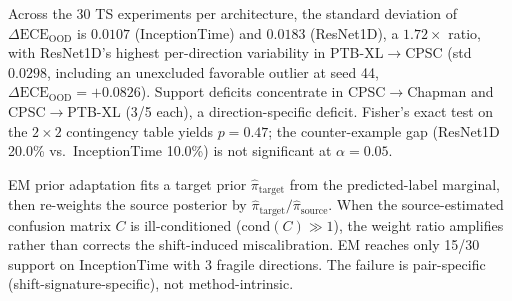 \documentclass[review,12pt,nonatbib]{elsarticle}
\begin{document}
Across the 30 TS experiments per
architecture, the standard deviation of $\Delta\text{ECE}_{\text{OOD}}$
is $0.0107$ (InceptionTime) and $0.0183$ (ResNet1D), a $1.72\times$
ratio, with ResNet1D's highest per-direction variability in
PTB-XL$\rightarrow$CPSC (std $0.0298$, including an unexcluded
favorable outlier at seed 44, $\Delta\text{ECE}_{\text{OOD}}=+0.0826$).
Support deficits concentrate in CPSC$\rightarrow$Chapman and
CPSC$\rightarrow$PTB-XL (3/5 each), a direction-specific deficit.
Fisher's exact test on the $2\times2$ contingency table yields
$p = 0.47$; the counter-example gap (ResNet1D 20.0\% vs.\
InceptionTime 10.0\%) is not significant at $\alpha = 0.05$.

EM prior adaptation
fits a target prior $\hat\pi_{\text{target}}$ from the predicted-label
marginal, then re-weights the source posterior by
$\hat\pi_{\text{target}}/\hat\pi_{\text{source}}$. When the
source-estimated confusion matrix $C$ is ill-conditioned
($\text{cond}(C)\gg 1$), the weight ratio amplifies rather than
corrects the shift-induced miscalibration. EM reaches only 15/30
support on InceptionTime with 3 fragile directions. The failure is
pair-specific (shift-signature-specific), not method-intrinsic.
\end{document}
